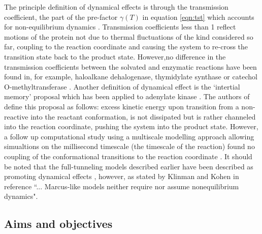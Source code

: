 The principle definition of dynamical effects is through the transmission coefficient, the part of the pre-factor $\gamma(T)$ in equation \ref{eqn:tst} which accounts for non-equilibrium dynamics \cite{kamerlinDawn21stCentury2010a,warshelPerspectiveDefiningQuantifying2016}. Transmission coefficients less than \num{1} reflect motions of the protein not due to thermal fluctuations of the kind considered so far, coupling to the reaction coordinate and causing the system to re-cross the transition state back to the product state. However,no difference in the transmission coefficients between the solvated and enzymatic reactions have been found in, for example, haloalkane dehalogenase\cite{olssonSoluteSolventDynamics2004}, thymidylate synthase \cite{kanaanTheoreticalStudyTemperature2010} or catechol O-methyltransferase \cite{rocaCouplingProteinReaction2006}. Another definition of dynamical effect is the `intertial memory' proposal \cite{warshelPerspectiveDefiningQuantifying2016} which has been applied to adenylate kinase \cite{eisenmesserIntrinsicDynamicsEnzyme2005, henzler-wildmanIntrinsicMotionsEnzymatic2007, olssonSoluteSolventDynamics2004}.  The authors of \cite{warshelPerspectiveDefiningQuantifying2016, kamerlinDawn21stCentury2010a} define this proposal as follows: excess kinetic energy upon transition from a non-reactive into the reactant conformation, is not dissipated but is rather channeled into the reaction coordinate, pushing the system into the product state. However, a follow up computational study using a multiscale modelling approach \cite{kamerlinMultiscaleModelingBiological2011} allowing simualtions on the millisecond timescale (the timescale of the reaction) found no coupling of the conformational transitions to the reaction coordinate \cite{pisliakovEnzymeMillisecondConformational2009}.  It should be noted that the full-tunneling models described earlier have been described as promoting dynamical effects \cite{warshelPerspectiveDefiningQuantifying2016}, however, as stated by Klinman and Kohen  in reference \cite{klinmanHydrogenTunnelingLinks2013} ``... Marcus-like models neither require nor assume nonequilibrium dynamics".  


\subsection{Aims and objectives}

